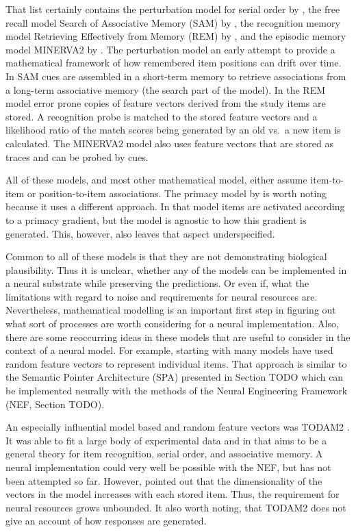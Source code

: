 That list certainly contains the perturbation model for serial order by \textcite{Estes1972}, the free recall model Search of Associative Memory (SAM) by \textcite{Raaijmakers1981}, the recognition memory model Retrieving Effectively from Memory (REM) by \textcite{Shiffrin1997}, and the episodic memory model MINERVA2 by \textcite{Hintzman1988}.
The perturbation model an early attempt to provide a mathematical framework of how remembered item positions can drift over time.
In SAM cues are assembled in a short-term memory to retrieve associations from a long-term associative memory (the search part of the model).
In the REM model error prone copies of feature vectors derived from the study items are stored.
A recognition probe is matched to the stored feature vectors and a likelihood ratio of the match scores being generated by an old vs.\ a new item is calculated.
The MINERVA2 model also uses feature vectors that are stored as traces and can be probed by cues.

All of these models, and most other mathematical model, either assume item-to-item or position-to-item associations.
The primacy model by \textcite{Page1998} is worth noting because it uses a different approach.
In that model items are activated according to a primacy gradient, but the model is agnostic to how this gradient is generated.
This, however, also leaves that aspect underspecified.

Common to all of these models is that they are not demonstrating biological plausibility.
Thus it is unclear, whether any of the models can be implemented in a neural substrate while preserving the predictions.
Or even if, what the limitations with regard to noise and requirements for neural resources are.
Nevertheless, mathematical modelling is an important first step in figuring out what sort of processes are worth considering for a neural implementation.
Also, there are some reoccurring ideas in these models that are useful to consider in the context of a neural model.
For example, starting with \textcite{Anderson1973} many models have used random feature vectors to represent individual items.
That approach is similar to the Semantic Pointer Architecture (SPA) presented in Section TODO which can be implemented neurally with the methods of the Neural Engineering Framework (NEF, Section TODO).

An especially influential model based and random feature vectors was TODAM2 \parencite{Murdock1993}.
It was able to fit a large body of experimental data and in that aims to be a general theory for item recognition, serial order, and associative memory.
A neural implementation could very well be possible with the NEF, but has not been attempted so far.
However, \textcite{Choo2010} pointed out that the dimensionality of the vectors in the model increases with each stored item.
Thus, the requirement for neural resources grows unbounded.
It also worth noting, that TODAM2 does not give an account of how responses are generated.

